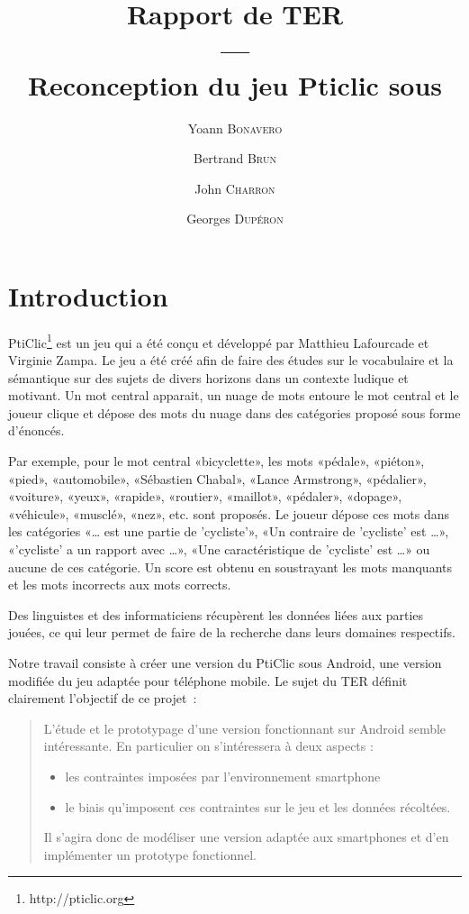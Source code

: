 \documentclass[a4paper,11pt,french]{article}
\title{Rapport de TER\\---\\Reconception du jeu Pticlic sous \android{}}
\author{Yoann \textsc{Bonavero} \and Bertrand \textsc{Brun} \and John \textsc{Charron} \and Georges \textsc{Dupéron}}
\def\android{Android\texttrademark{}}
\begin{document}
\maketitle


\pagestyle{empty}
\thispagestyle{empty}

\tableofcontents


\pagestyle{empty}
\thispagestyle{empty}
\newpage
\setcounter{page}{1}
\pagestyle{plain}


\section{Introduction}

PtiClic\footnote{http://pticlic.org} est un jeu qui a été conçu et développé par Matthieu Lafourcade et Virginie Zampa. Le jeu a été créé afin de faire des études sur le vocabulaire et la sémantique sur des sujets de divers horizons dans un contexte ludique et motivant. Un mot central apparait, un nuage de mots entoure le mot central et le joueur clique et dépose des mots du nuage dans des catégories proposé sous forme d'énoncés. 

Par exemple, pour le mot central «bicyclette», les mots «pédale», «piéton», «pied», «automobile», «Sébastien Chabal», «Lance Armstrong», «pédalier», «voiture», «yeux», «rapide», «routier», «maillot», «pédaler», «dopage», «véhicule», «musclé», «nez», etc. sont proposés. Le joueur dépose ces mots dans les catégories «\dots{} est une partie de 'cycliste'», «Un contraire de 'cycliste' est \dots{}», «'cycliste' a un rapport avec \dots{}»,  «Une caractéristique de 'cycliste' est \dots{}» ou aucune de ces catégorie. Un score est obtenu en soustrayant les mots manquants et les mots incorrects aux mots corrects. 

Des linguistes et des informaticiens récupèrent les données liées aux parties jouées, ce qui leur permet de faire de la recherche dans leurs domaines respectifs.

Notre travail consiste à créer une version du PtiClic sous \android{}, une version modifiée du jeu adaptée pour téléphone mobile. Le sujet du TER définit clairement l'objectif de ce projet~:

\begin{quotation}
  L'étude et le prototypage d'une version fonctionnant sur \android{} semble intéressante. En particulier on s'intéressera à deux aspects :
  \begin{itemize}
  \item les contraintes imposées par l'environnement smartphone
  \item le biais qu'imposent ces contraintes sur le jeu et les données récoltées.
  \end{itemize}
  
  Il s'agira donc de modéliser une version adaptée aux smartphones et d'en implémenter un prototype fonctionnel.
\end{quotation}
\end{document}
